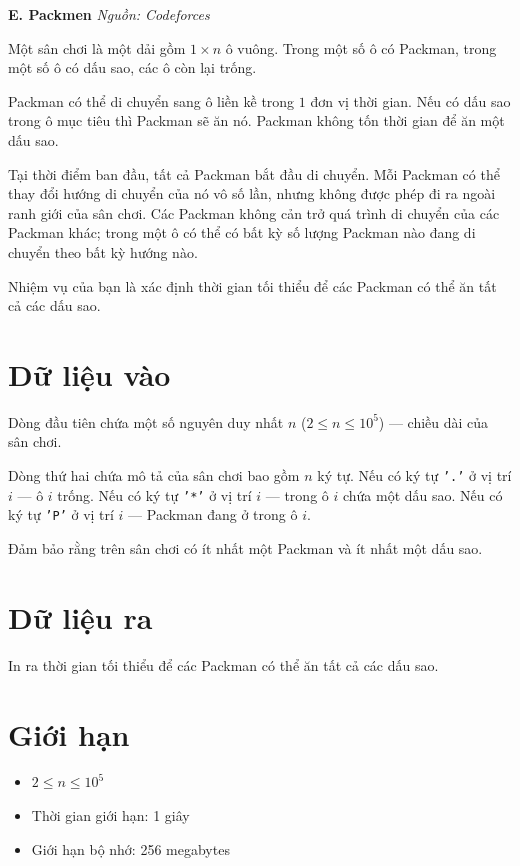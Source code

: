 \documentclass[12pt,a4paper]{article}
\newcommand{\problem}[2]{%
  \addcontentsline{toc}{section}{#1}%
  \begin{mdframed}[
    linecolor=framecolor,
    linewidth=1.5pt,
    backgroundcolor=white,
    topline=true, bottomline=true,
    leftline=true, rightline=true,
    innerleftmargin=10pt, innerrightmargin=10pt,
    innertopmargin=6pt, innerbottommargin=6pt,
  ]
  \textbf{\large #1} \hfill \textit{Nguồn: #2}
  \end{mdframed}
  \vspace{4pt}%
}
\begin{document}
\newpage







\problem{E. Packmen}{Codeforces}

Một sân chơi là một dải gồm $1 \times n$ ô vuông. Trong một số ô có Packman, trong một số ô có dấu sao, các ô còn lại trống.

Packman có thể di chuyển sang ô liền kề trong $1$ đơn vị thời gian. Nếu có dấu sao trong ô mục tiêu thì Packman sẽ ăn nó. Packman không tốn thời gian để ăn một dấu sao.

Tại thời điểm ban đầu, tất cả Packman bắt đầu di chuyển. Mỗi Packman có thể thay đổi hướng di chuyển của nó vô số lần, nhưng không được phép đi ra ngoài ranh giới của sân chơi. Các Packman không cản trở quá trình di chuyển của các Packman khác; trong một ô có thể có bất kỳ số lượng Packman nào đang di chuyển theo bất kỳ hướng nào.

Nhiệm vụ của bạn là xác định thời gian tối thiểu để các Packman có thể ăn tất cả các dấu sao.

\section*{Dữ liệu vào}
Dòng đầu tiên chứa một số nguyên duy nhất $n$ ($2 \le n \le 10^5$) --- chiều dài của sân chơi.

Dòng thứ hai chứa mô tả của sân chơi bao gồm $n$ ký tự. Nếu có ký tự \texttt{'.'} ở vị trí $i$ --- ô $i$ trống. Nếu có ký tự \texttt{'*'} ở vị trí $i$ --- trong ô $i$ chứa một dấu sao. Nếu có ký tự \texttt{'P'} ở vị trí $i$ --- Packman đang ở trong ô $i$.

Đảm bảo rằng trên sân chơi có ít nhất một Packman và ít nhất một dấu sao.

\section*{Dữ liệu ra}
In ra thời gian tối thiểu để các Packman có thể ăn tất cả các dấu sao.

\section*{Giới hạn}
\begin{constraintbox}
\begin{itemize}
    \item $2 \le n \le 10^5$
    \item Thời gian giới hạn: 1 giây
    \item Giới hạn bộ nhớ: 256 megabytes
\end{itemize}
\end{constraintbox}
\end{document}
